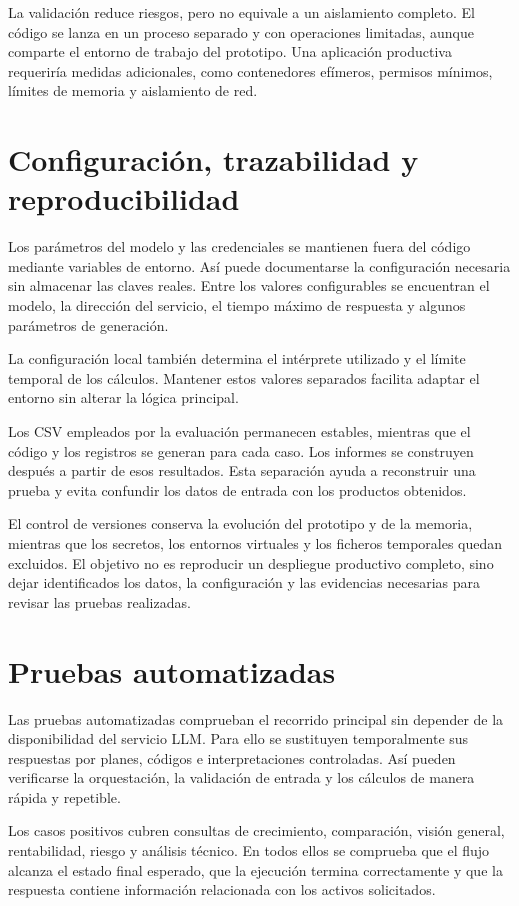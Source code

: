 La validación reduce riesgos, pero no equivale a un aislamiento completo. El código se lanza en un proceso separado y con operaciones limitadas, aunque comparte el entorno de trabajo del prototipo. Una aplicación productiva requeriría medidas adicionales, como contenedores efímeros, permisos mínimos, límites de memoria y aislamiento de red.

\section{Configuración, trazabilidad y reproducibilidad}

Los parámetros del modelo y las credenciales se mantienen fuera del código mediante variables de entorno. Así puede documentarse la configuración necesaria sin almacenar las claves reales. Entre los valores configurables se encuentran el modelo, la dirección del servicio, el tiempo máximo de respuesta y algunos parámetros de generación.

La configuración local también determina el intérprete utilizado y el límite temporal de los cálculos. Mantener estos valores separados facilita adaptar el entorno sin alterar la lógica principal.

Los CSV empleados por la evaluación permanecen estables, mientras que el código y los registros se generan para cada caso. Los informes se construyen después a partir de esos resultados. Esta separación ayuda a reconstruir una prueba y evita confundir los datos de entrada con los productos obtenidos.

El control de versiones conserva la evolución del prototipo y de la memoria, mientras que los secretos, los entornos virtuales y los ficheros temporales quedan excluidos. El objetivo no es reproducir un despliegue productivo completo, sino dejar identificados los datos, la configuración y las evidencias necesarias para revisar las pruebas realizadas.

\section{Pruebas automatizadas}

Las pruebas automatizadas comprueban el recorrido principal sin depender de la disponibilidad del servicio LLM. Para ello se sustituyen temporalmente sus respuestas por planes, códigos e interpretaciones controladas. Así pueden verificarse la orquestación, la validación de entrada y los cálculos de manera rápida y repetible.

Los casos positivos cubren consultas de crecimiento, comparación, visión general, rentabilidad, riesgo y análisis técnico. En todos ellos se comprueba que el flujo alcanza el estado final esperado, que la ejecución termina correctamente y que la respuesta contiene información relacionada con los activos solicitados.

